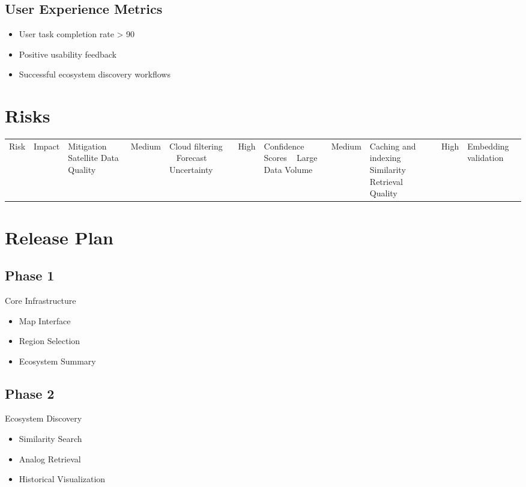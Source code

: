 \documentclass[11pt,a4paper]{article}
\begin{document}
\subsection{User Experience Metrics}

\begin{itemize}
\item User task completion rate > 90%
\item Positive usability feedback
\item Successful ecosystem discovery workflows
\end{itemize}

\section{Risks}

\begin{tabular}{|p{5cm}|p{4cm}|p{4cm}|}
\hline
Risk & Impact & Mitigation \
\hline
Satellite Data Quality &
Medium &
Cloud filtering \
\hline
Forecast Uncertainty &
High &
Confidence Scores \
\hline
Large Data Volume &
Medium &
Caching and indexing \
\hline
Similarity Retrieval Quality &
High &
Embedding validation \
\hline
\end{tabular}

\section{Release Plan}

\subsection{Phase 1}

Core Infrastructure

\begin{itemize}
\item Map Interface
\item Region Selection
\item Ecosystem Summary
\end{itemize}

\subsection{Phase 2}

Ecosystem Discovery

\begin{itemize}
\item Similarity Search
\item Analog Retrieval
\item Historical Visualization
\end{itemize}
\end{document}
